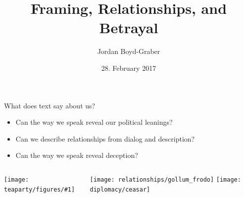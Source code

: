 \documentclass[compress]{beamer}
\title{Framing, Relationships, and Betrayal}
\author{Jordan Boyd-Graber}
\date{28. February 2017}
\institute[] %
{University of Colorado Boulder}
\newcommand{\gfxtp}[2]{
\begin{center}
	\texttt{[image: teaparty/figures/\#1]}
\end{center}
}
\begin{document}

\frame{
\titlepage
\tiny
}



\begin{frame}{What does text say about us?}

  \begin{itemize}
    \item Can the way we speak reveal our \alert<1>{political leanings}?
    \item Can we describe \alert<2>{relationships} from dialog and description?
    \item Can the way we speak reveal \alert<3>{deception}?
  \end{itemize}

  \begin{columns}
    \gfxtp{polarization_1}{.7}
    \texttt{[image: relationships/gollum\_frodo]}
    \texttt{[image: diplomacy/ceasar]}
    \end{columns}

\end{frame}


\end{document}
